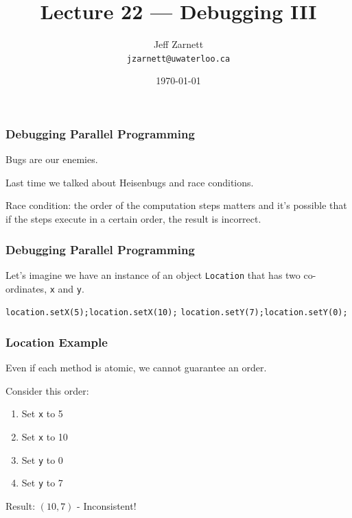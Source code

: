 
\usepackage{alltt}

\title{Lecture 22 --- Debugging III }

\author{Jeff Zarnett \\ \small \texttt{jzarnett@uwaterloo.ca}}
\date{\today}



\begin{frame}
  \titlepage

\end{frame}

\begin{frame}
\frametitle{Debugging Parallel Programming}
\begin{changemargin}{1cm}
Bugs are our enemies.

Last time we talked about Heisenbugs and race conditions.

Race condition: the order of the computation steps matters and it's possible that if the steps execute in a certain order, the result is incorrect.

\end{changemargin}
\end{frame}


\begin{frame}
\frametitle{Debugging Parallel Programming}
\begin{changemargin}{1cm}

Let's imagine we have an instance of an object \texttt{Location} that has two co-ordinates, \texttt{x} and \texttt{y}. 


\texttt{location.setX(5);\quad\quad location.setX(10);}
\texttt{location.setY(7);\quad\quad location.setY(0);}

\end{changemargin}
\end{frame}

\begin{frame}
\frametitle{Location Example}
\begin{changemargin}{1cm}
Even if each method is atomic, we cannot guarantee an order.

Consider this order:
\begin{enumerate}
	\item Set \texttt{x} to 5
	\item Set \texttt{x} to 10
	\item Set \texttt{y} to 0
	\item Set \texttt{y} to 7
\end{enumerate} 

Result: $(10, 7)$ - Inconsistent! 

\end{changemargin}
\end{frame}


